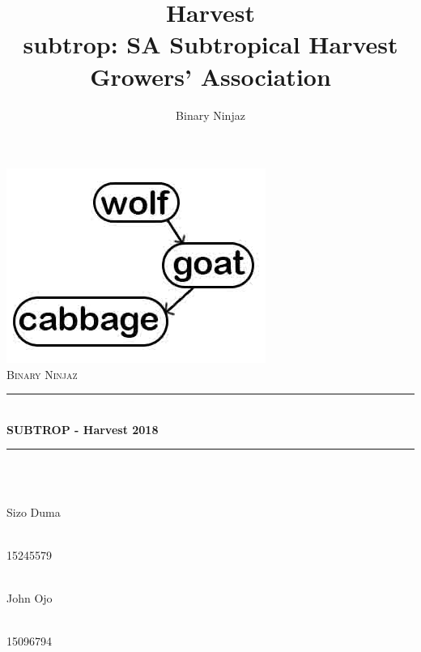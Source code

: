 \documentclass[12pt]{article}
\title{Harvest \\
\large subtrop: SA Subtropical Harvest Growers' Association
}
\author{Binary Ninjaz}
\date{}
\begin{document}
	\begin{titlepage}
	
	\begin{center}
        \includegraphics[width=0.7\linewidth]{team.jpg}\\[1cm]
		\textsc{\LARGE Binary Ninjaz}\\[0.3cm]
		\rule{\linewidth}{0.5mm} \\[1cm]
		{ \huge \bfseries SUBTROP - Harvest 2018}\\[0.5cm]
		\rule{\linewidth}{0.5mm} \\[1cm] 		
  
		
		\begin{minipage}{0.4\textwidth}
			\begin{flushleft} \large
				\emph{} \\
				Sizo {Duma}
			\end{flushleft}
		\end{minipage}
		\begin{minipage}{0.4\textwidth}
			\begin{flushright} \large
				\emph{} \\
				15245579
			\end{flushright}
		\end{minipage}

		\begin{minipage}{0.4\textwidth}
			\begin{flushleft} \large
            	\emph{} \\
				John {Ojo}
			\end{flushleft}
		\end{minipage}
		\begin{minipage}{0.4\textwidth}
			\begin{flushright} \large
				\emph{} \\
				15096794 
			\end{flushright}
		\end{minipage}
		

\end{center}
\end{titlepage}
\end{document}
